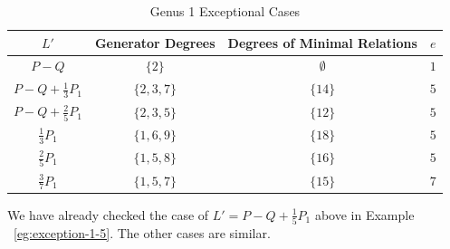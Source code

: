 \documentclass{amsart}
\theoremstyle{plain}
\theoremstyle{definition}
\theoremstyle{remark}
\newtheorem{rem}[thm]{Remark}
\numberwithin{equation}{section}
\newcommand{\halfcan}{L}
\begin{document}
\begin{table}	
\begin{tabular}
{| c || c | c | c |}
	\hline
	$\halfcan'$ & Generator Degrees & Degrees of Minimal Relations & $e$ \\
	\hline
	\hline
	$P - Q$ & $\{2\}$ & $\emptyset$ & $1$\\	\hline

	$P - Q + \frac{1}{3} P_1$ & $\{2, 3, 7\}$ & $\{14\}$ & $5$ \\	\hline

	$P - Q + \frac{2}{5} P_1$ & $\{2, 3, 5\}$ & $\{12\}$ & $5$\\	\hline
	
	$\frac{1}{3} P_1$ & $\{1, 6, 9\}$ & $\{18\}$ & $5$ \\	\hline

	$\frac{2}{5} P_1$ & $\{1, 5, 8\}$ & $\{16\}$ & $5$ \\	\hline
	
	$\frac{3}{7} P_1$ & $\{1, 5, 7\}$ & $\{15\}$ & $7$ \\	\hline
\end{tabular}

\caption{Genus 1 Exceptional Cases}
\label{table:g-1-exceptional}
	
\end{table}

We have already checked the case of 
$L' = P - Q + \frac{1}{5}P_1$ above in Example ~\ref{eg:exception-1-5}. The other cases are similar.
\end{document}
